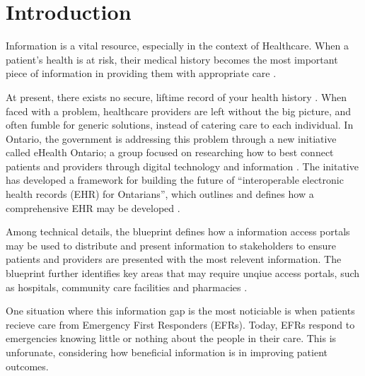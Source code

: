 
\section{Introduction}
\par Information is a vital resource, especially in the context of Healthcare. When a patient's health is at risk, their medical history becomes the most important piece of information in providing them with appropriate care \cite{web1}.

At present, there exists no secure, liftime record of your health history \cite{Street2014}. When faced with a problem, healthcare providers are left without the big picture, and often fumble for generic solutions, instead of catering care to each individual. In Ontario, the government is addressing this problem through a new initiative called eHealth Ontario; a group focused on researching how to best connect patients and providers through digital technology and information \cite{web1}. The initative has developed a framework for building the future of ``interoperable electronic health records (EHR) for Ontarians'', which outlines and defines how a comprehensive EHR may be developed \cite{b1}.

Among technical details, the blueprint defines how a information access portals may be used to distribute and present information to stakeholders to ensure patients and providers are presented with the most relevent information. The blueprint further identifies key areas that may require unqiue access portals, such as hospitals, community care facilities and pharmacies \cite{Street2014}.

\iffalse where access portals may be

 in the most effective and streamlined manner. The blueprint identifies key areas,


centralized system with standardized records, accessed by different portals may be used to

 The group has developed a technical blueprint for how health information may

The blueprint is the framework for building ``interoperable electrnoic health records for Ontarions'' \fi

\iffalse The Ontario government is looking to solve this problem through the eHealth Ontario initiative, a group researching how best to impliment digital technologies that connect patients and providers through information \cite{web1}.\fi

One situation where this information gap is the most noticiable is when patients recieve care from Emergency First Responders (EFRs). Today, EFRs respond to emergencies knowing little or nothing about the people in their care. This is unforunate, considering how beneficial information is in improving patient outcomes. \iffalse For example, nursing homes often carry documents that contain health information on their residents. This information, including medications, allergies and diagonsed disorders gives EFRs an important base-knowledge for how assessing a patient. \fi

